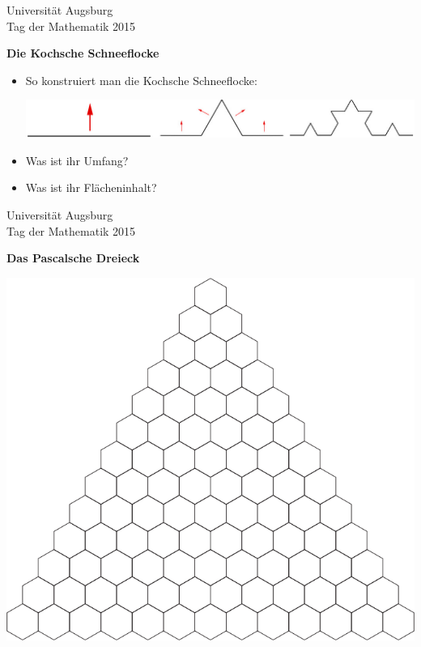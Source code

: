 \documentclass[a4paper,ngerman]{scrartcl}
\newcommand{\drawHere}{%
  \begin{center}%
    \fbox{\parbox[c][0.9\textwidth]{0.9\textwidth}{\ }}%
  \end{center}}
\newcommand{\header}{%
  \begin{raggedleft}
  \tiny Universität Augsburg \\
  Tag der Mathematik 2015 \par
  \end{raggedleft}}
\begin{document}
\header

\begin{center}
  \Huge\bf
  Die Kochsche Schneeflocke
\end{center}

\vfill
\drawHere

\vfill
\Large

\renewcommand{\labelitemi}{$\bigstar$}

\begin{itemize}
  \item So konstruiert man die Kochsche Schneeflocke:

  \begin{center}
    \includegraphics[scale=0.5]{koch}
  \end{center}
  \item Was ist ihr Umfang?
  \item Was ist ihr Flächeninhalt?
\end{itemize}

\newpage



\header

\begin{center}
  \Huge\bf
  Das Pascalsche Dreieck
\end{center}

\begin{center}
\includegraphics[scale=1.2]{pascal-triangle}
\end{center}
\end{document}

